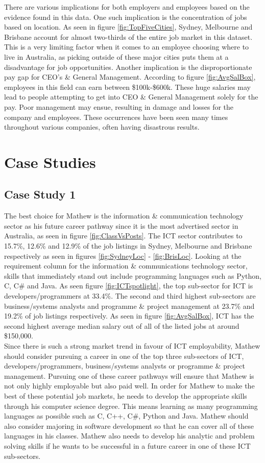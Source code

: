 \documentclass[twoside, 12pt, a4paper]{article}
\begin{document}
There are various implications for both employers and employees based on the evidence found in this data. One such implication is the concentration of jobs based on location. As seen in figure \ref{fig:TopFiveCities}, Sydney, Melbourne and Brisbane account for almost two-thirds of the entire job market in this dataset. This is a very limiting factor when it comes to an employee choosing where to live in Australia, as picking outside of these major cities puts them at a disadvantage for job opportunities. Another implication is the disproportionate pay gap for CEO's \& General Management. According to figure \ref{fig:AvgSalBox}, employees in this field can earn between \$100k-\$600k. These huge salaries may lead to people attempting to get into CEO \& General Management solely for the pay. Poor management may ensue, resulting in damage and losses for the company and employees. These occurrences have been seen many times throughout various companies, often having disastrous results. 


\newpage
\section{Case Studies}
\subsection{Case Study 1}

The best choice for Mathew is the information \& communication technology sector as his future career pathway since it is the most advertised sector in Australia, as seen in figure \ref{fig:ClassVsPosts}. The ICT sector contributes to 15.7\%, 12.6\% and 12.9\% of the job listings in Sydney, Melbourne and Brisbane respectively as seen in figures \ref{fig:SydneyLoc} - \ref{fig:BrisLoc}. Looking at the requirement column for the information \& communications technology sector, skills that immediately stand out include programming languages such as Python, C, C\# and Java. As seen figure \ref{fig:ICTspotlight}, the top sub-sector for ICT is developers/programmers at 33.4\%. The second and third highest sub-sectors are business/systems analysts and programme \& project management at 23.7\% and 19.2\% of job listings respectively. As seen in figure \ref{fig:AvgSalBox}, ICT has the second highest average median salary out of all of the listed jobs at around \$150,000.\\
Since there is such a strong market trend in favour of ICT employability, Mathew should consider pursuing a career in one of the top three sub-sectors of ICT, developers/programmers, business/systems analysts or programme \& project management. Pursuing one of these career pathways will ensure that Mathew is not only highly employable but also paid well. In order for Mathew to make the best of these potential job markets, he needs to develop the appropriate skills through his computer science degree. This means learning as many programming languages as possible such as C, C++, C\#, Python and Java. Mathew should also consider majoring in software development so that he can cover all of these languages in his classes. Mathew also needs to develop his analytic and problem solving skills if he wants to be successful in a future career in one of these ICT sub-sectors. 
\end{document}
